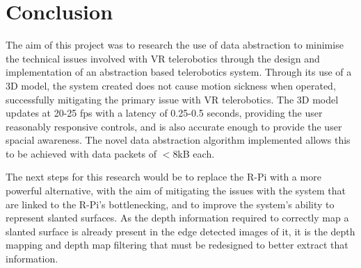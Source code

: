 \chapter{Conclusion}
\label{chapter:conclusion}

The aim of this project was to research the use of data abstraction to minimise the technical issues involved with VR telerobotics through the design and implementation of an abstraction based telerobotics system. Through its use of a 3D model, the system created does not cause motion sickness when operated, successfully mitigating the primary issue with VR telerobotics. The 3D model updates at 20-25 fps with a latency of 0.25-0.5 seconds, providing the user reasonably responsive controls, and is also accurate enough to provide the user spacial awareness. The novel data abstraction algorithm implemented allows this to be achieved with data packets of $<$8kB each.

The next steps for this research would be to replace the R-Pi with a more powerful alternative, with the aim of mitigating the issues with the system that are linked to the R-Pi's bottlenecking, and to improve the system's ability to represent slanted surfaces. As the depth information required to correctly map a slanted surface is already present in the edge detected images of it, it is the depth mapping and depth map filtering that must be redesigned to better extract that information.